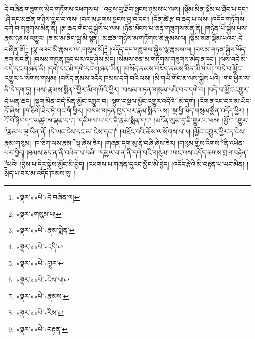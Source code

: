 དེ་བཞིན་གཟུགས་མེད་གཏོགས་འཕགས་པ། །འབྲས་བུ་ཐོབ་སྦྱངས་ཉམས་པ་ལས། །སྡོམ་མིན་སྡོམ་པ་ཐོབ་པ་དང་། །ཤི་དང་མཚན་གཉིས་བྱུང་བ་ལས། །བར་མ་ཤུགས་བླངས་བྱ་བ་དང་། །དོན་ཚེ་རྩ་བ་ཆད་པ་ལས། །འདོད་གཏོགས་དགེ་བ་གཟུགས་མིན་ནི། །རྩ་ཆད་གོང་དུ་སྐྱེས་པ་ལས། །ཉོན་མོངས་པ་ཅན་གཟུགས་མིན་ནི། །གཉེན་པོ་སྐྱེས་པས་རྣམ་ཉམས་འགྱུར། །ཟ་མ་མ་ནིང་སྒྲ་མི་སྙན། །མཚན་གཉིས་མ་གཏོགས་མི་རྣམས་ལ། །སྡོམ་མིན་སྡོམ་པའང་:དེ་བཞིན་ནོ།\footnote{«སྣར་»«པེ་»དེ་བཞིན་ལ།} །ལྷ་ལའང་མི་རྣམས་ལ་:གསུམ་མོ།\footnote{«སྣར་»གསུམ་པ།} །འདོད་དང་གཟུགས་སྐྱེས་ལྷ་རྣམས་ལ། །བསམ་གཏན་སྐྱེས་ཡོད་ཟག་མེད་ནི། །བསམ་གཏན་ཁྱད་པར་འདུ་ཤེས་མེད། །སེམས་ཅན་མ་གཏོགས་གཟུགས་མེད་ནའང་། །ལས་བདེ་མི་བདེ་དང་གཞན་ནི། །དགེ་དང་མི་དགེ་དང་གཞན་ཡིན། །བསོད་ནམས་བསོད་ནམས་མིན་མི་གཡོ། །བདེ་བ་མྱོང་འགྱུར་ལ་སོགས་གསུམ། །བསོད་ནམས་འདོད་ཁམས་དགེ་བའི་ལས། །མི་གཡོ་གོང་མ་ལས་སྐྱེས་པའི། །གང་ཕྱིར་ས་ནི་དེ་དག་ཏུ། །ལས་:རྣམས་སྨིན་\footnote{«སྣར་»«པེ་»རྣམ་སྨིན་}ཕྱིར་མི་གཡོའི་ཕྱིར། །བསམ་གཏན་གསུམ་པའི་བར་དགེ་བ། །བདེ་བ་མྱོང་འགྱུར་དེ་ཡན་ཆད། །སྡུག་མིན་བདེ་མིན་མྱོང་འགྱུར་བ། །སྡུག་བསྔལ་མྱོང་འགྱུར་འདིའི་\footnote{«སྣར་»«པེ་»འདི་}མི་དགེ། །འོག་ནའང་བར་མ་ཡོད་དོ་ཞེས། །ཁ་ཅིག་ཟེར་ཏེ་གང་གི་ཕྱིར། །བསམ་གཏན་ཁྱད་པར་རྣམ་སྨིན་ལས། །སྔ་ཕྱི་མེད་གསུམ་སྨིན་འདོད་ཕྱིར། །ངོ་བོ་ཉིད་དང་མཚུངས་ལྡན་དང་། །དམིགས་པ་དང་ནི་རྣམ་སྨིན་དང་། །མངོན་སུམ་དུ་ནི་གྱུར་པ་ལས། །མྱོང་འགྱུར་\footnote{«སྣར་»«པེ་»གྱུར་}རྣམ་པ་ལྔ་ཡིན་ནོ། །དེ་ཡང་ངེས་དང་མ་:ངེས་དང་།\footnote{«སྣར་»«པེ་»ངེས་པ།} །མཐོང་བའི་ཆོས་ལ་སོགས་པ་ལ། །མྱོང་འགྱུར་ཕྱིར་ན་ངེས་རྣམ་གསུམ། །ཁ་ཅིག་ལས་རྣམ་\footnote{«སྣར་»«པེ་»རྣམས་}ལྔ་ཞེས་ཟེར། །གཞན་དག་མུ་ནི་བཞི་ཞེས་ཟེར། །གསུམ་གྱིས་རིགས་\footnote{«སྣར་»«པེ་»རིས་}ནི་འཕེན་པར་བྱེད། །ཐམས་ཅད་ན་ནི་འཕེན་པ་བཞི། །དམྱལ་བ་ན་ནི་དགེ་བའི་གསུམ། །གང་ལས་འདོད་ཆགས་བྲལ་བརྟེན་\footnote{«སྣར་»«པེ་»བརྟན་}པའི། །བྱིས་པ་དེར་སྐྱེས་མྱོང་མི་བྱེད། །འཕགས་པ་གཞན་དུའང་མྱོང་མི་བྱེད། །འདོད་རྩེའི་མི་བརྟན་པ་ཡང་མིན། །སྲིད་པ་བར་མ་འདོད་ཁམས་སུ། །
